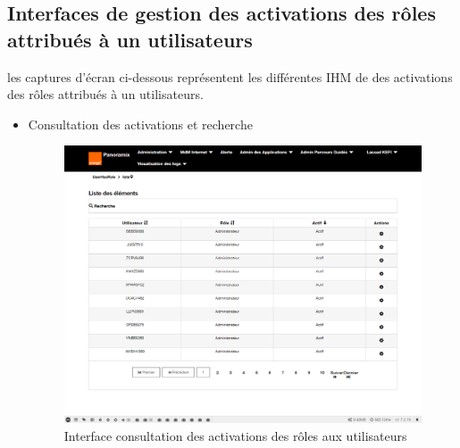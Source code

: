 \subsection{Interfaces de gestion des activations des rôles attribués à un utilisateurs}
les captures d'écran ci-dessous représentent les différentes IHM de des activations des rôles attribués à un utilisateurs.
\newpage
\begin{itemize}
	\item Consultation des activations et recherche
	\begin{figure}[H]
		\centering
		\includegraphics[width=0.7\linewidth]{"img/screenshots/activation des roles/index"}
		\caption[Interface consultation des activations des rôles aux utilisateurs]{Interface consultation des activations des rôles aux utilisateurs}
		\label{fig:index-activation}
	\end{figure}
	

\end{itemize}

